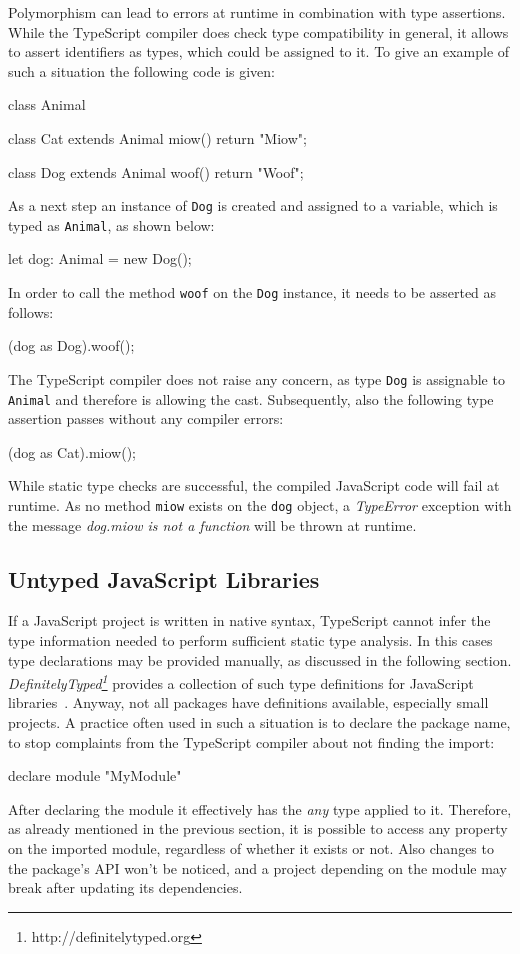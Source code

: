 Polymorphism can lead to errors at runtime in combination with type assertions. While the TypeScript compiler does check type compatibility in general, it allows to assert identifiers as types, which could be assigned to it. To give an example of such a situation the following code is given:
\begin{JsCode}[numbers=none]
class Animal { }

class Cat extends Animal {
  miow() {
    return "Miow";
  }
}

class Dog extends Animal {
  woof() {
    return "Woof";
  }
}
\end{JsCode}
As a next step an instance of \texttt{Dog} is created and assigned to a variable, which is typed as \texttt{Animal}, as shown below:
\begin{JsCode}[numbers=none]
let dog: Animal = new Dog();
\end{JsCode}
In order to call the method \texttt{woof} on the \texttt{Dog} instance, it needs to be asserted as follows:
\begin{JsCode}[numbers=none]
(dog as Dog).woof();
\end{JsCode}
The TypeScript compiler does not raise any concern, as type \texttt{Dog} is assignable to \texttt{Animal} and therefore is allowing the cast. Subsequently, also the following type assertion passes without any compiler errors:
\begin{JsCode}[numbers=none]
(dog as Cat).miow();
\end{JsCode}
While static type checks are successful, the compiled JavaScript code will fail at runtime. As no method \texttt{miow} exists on the \texttt{dog} object, a \emph{TypeError} exception with the message \emph{dog.miow is not a function} will be thrown at runtime.

\subsection{Untyped JavaScript Libraries}

If a JavaScript project is written in native syntax, TypeScript cannot infer the type information needed to perform sufficient static type analysis. In this cases type declarations may be provided manually, as discussed in the following section. \emph{DefinitelyTyped\footnote{http://definitelytyped.org}} provides a collection of such type definitions for JavaScript libraries~\cite{DefinitelyTyped}. Anyway, not all packages have definitions available, especially small projects. A practice often used in such a situation is to declare the package name, to stop complaints from the TypeScript compiler about not finding the import:
\begin{JsCode}[numbers=none]
declare module "MyModule"
\end{JsCode}
After declaring the module it effectively has the \emph{any} type applied to it. Therefore, as already mentioned in the previous section, it is possible to access any property on the imported module, regardless of whether it exists or not. Also changes to the package's API won't be noticed, and a project depending on the module may break after updating its dependencies.

